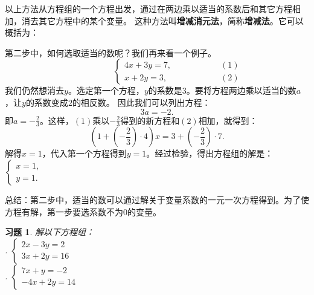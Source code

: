 \documentclass[12pt,UTF8]{ctexbook}
\newtheorem{xt}{习题}[section]
\begin{document}
以上方法从方程组的一个方程出发，通过在两边乘以适当的系数后和其它方程相加，消去其它方程中的某个变量。
这种方法叫\textbf{增减消元法}，简称\textbf{增减法}。它可以概括为：
\begin{center}
\end{center}

第二步中，如何选取适当的数呢？我们再来看一个例子。
$$ \quad \quad \quad \quad \quad\left\{
\begin{array}{cr}
     4x + 3y = 7, & \quad \quad \quad \quad \quad (1) \\
     x + 2y = 3, & \quad \quad \quad \quad \quad (2)
\end{array}\right.
$$
我们仍然想消去$y$。选定第一个方程，$y$的系数是$3$。要将方程两边乘以适当的数$a$，让$y$的系数变成$2$的相反数。
因此我们可以列出方程：
$$ 3a = -2.$$
即$a = -\frac{2}{3}$。这样，$(1)$乘以$-\frac23$得到的新方程和$(2)$相加，就得到：
$$ \left(1 + (-\frac{2}{3}) \cdot 4\right) x = 3 + (-\frac{2}{3}) \cdot 7.$$
解得$x = 1$，代入第一个方程得到$y = 1$。经过检验，得出方程组的解是：$\left\{ \begin{array}{c}
    x = 1, \\
    y = 1.
\end{array}\right.$

总结：第二步中，适当的数可以通过解关于变量系数的一元一次方程得到。为了使方程有解，第一步要选系数不为$0$的变量。

\begin{xt}\label{xt:6-1-0}
    解以下方程组：\\
    . $ \left\{
        \begin{array}{cr}
             2x - 3y = 2\\
             3x + 2y = 16
        \end{array}\right.
        $ \\
    . $\left\{
        \begin{array}{cr}
                7x + y = -2\\
                -4x + 2y = 14
        \end{array}\right.
        $ 
\end{xt}
\end{document}
